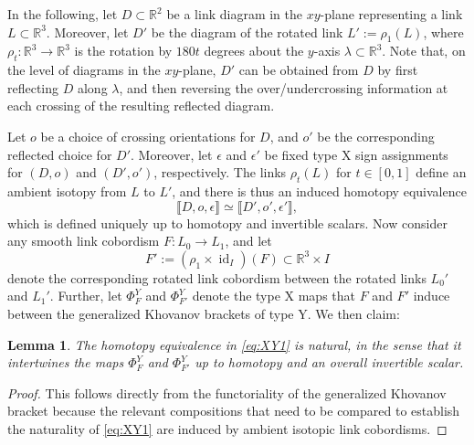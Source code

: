 \documentclass[12pt]{amsart}
\theoremstyle{definition}
\theoremstyle{plain}
\newtheorem{lemma}{Lemma}
\begin{document}
In the following, let $D\subset\mathbb{R}^2$ be a link diagram in the $xy$-plane representing a link $L\subset\mathbb{R}^3$.
Moreover, let $D'$ be the diagram of the rotated link $L':=\rho_1(L)$, where
$\rho_t\colon\mathbb{R}^3\rightarrow\mathbb{R}^3$
is the rotation by $180t$ degrees about the $y$-axis $\lambda\subset\mathbb{R}^3$.
Note that, on the level of diagrams in the $xy$-plane, $D'$ can be obtained from $D$ by first reflecting
$D$ along $\lambda$, and then reversing the over/undercrossing information
at each crossing of the resulting reflected diagram.

Let $o$ be a choice of crossing orientations for $D$, and $o'$ be the corresponding
reflected choice for $D'$. Moreover, let $\epsilon$ and $\epsilon'$ be fixed
type X sign assignments for $(D,o)$ and $(D',o')$, respectively.
The links $\rho_t(L)$ for $t\in[0,1]$ define an ambient isotopy from $L$ to $L'$, and
there is thus an induced homotopy equivalence
\begin{equation}\label{eq:XY1}
\llbracket D,o,\epsilon\rrbracket\simeq\llbracket D',o',\epsilon'\rrbracket,
\end{equation}
which is defined uniquely up to homotopy and invertible scalars.
Now consider any smooth link cobordism $F\colon L_0\rightarrow L_1$, and let
\begin{equation}\label{eq:XY2}
F':=(\rho_1\times\operatorname{id}_I)(F)\subset\mathbb{R}^3\times I
\end{equation}
denote the corresponding rotated link cobordism
between the rotated links $L_0'$ and $L_1'$.
Further, let $\Phi^Y_F$ and $\Phi^Y_{F'}$ denote the type X maps that $F$ and $F'$ induce between
the generalized Khovanov brackets of type Y. We then claim:

\begin{lemma}\label{lem:XY1}
The homotopy equivalence in \eqref{eq:XY1} is natural, in the sense that it intertwines
the maps $\Phi^Y_F$ and $\Phi^Y_{F'}$ up to homotopy and an overall invertible scalar.
\end{lemma}

\begin{proof} This follows directly from the functoriality of the generalized Khovanov bracket
because the relevant compositions that need to be compared to establish the naturality of \eqref{eq:XY1} are induced by ambient
isotopic link cobordisms.
\end{proof}
\end{document}

